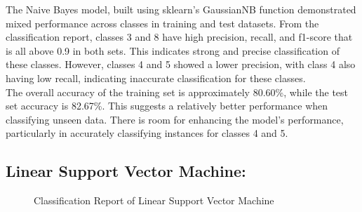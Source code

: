 \documentclass[11pt, letterpaper]{article}
\begin{document}
    \noindent The Naive Bayes model, built using sklearn’s GaussianNB function demonstrated mixed performance across classes in training and test datasets. From the classification report, classes 3 and 8 have high precision, recall, and f1-score that is all above 0.9 in both sets. This indicates strong and precise classification of these classes. However, classes 4 and 5 showed a lower precision, with class 4 also having low recall, indicating inaccurate classification for these classes.\\
    
    \noindent The overall accuracy of the training set is approximately 80.60\%, while the test set accuracy is 82.67\%. This suggests a relatively better performance when classifying unseen data. There is room for enhancing the model’s performance, particularly in accurately classifying instances for classes 4 and 5.
    
    \noindent\subsection*{Linear Support Vector Machine:}

    \begin{figure}[H]
        \centering
        \qquad
        \caption{Classification Report of Linear Support Vector Machine}
        \label{fig:class-report-svm}
    \end{figure}
\end{document}
